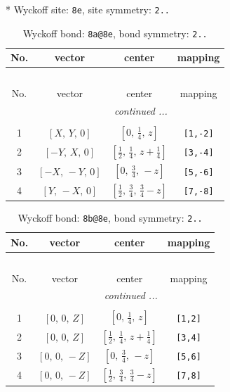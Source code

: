 \documentclass[fleqn,8pt]{jsarticle}
\begin{document}
* Wyckoff site: {\tt 8e}, site symmetry: {\tt 2..}
\renewcommand{\arraystretch}{1.2}
\begin{longtable}{cccc}
\caption{Wyckoff bond: {\tt 8a@8e}, bond symmetry: {\tt 2..}}
 \\
 \hline \hline
No. & vector & center & mapping \\ \hline \endfirsthead

\multicolumn{3}{l}{\tablename\ \thetable{}} \\
 \hline \hline
No. & vector & center & mapping \\ \hline \endhead

 \hline \hline
\multicolumn{3}{r}{\footnotesize\it continued ...} \\ \endfoot

 \hline \hline
\multicolumn{3}{r}{} \\ \endlastfoot

1 & $\left[ X,\, Y,\, 0 \right]$ & $\left[ 0,\, \frac{1}{4},\, z \right]$ & {\tt [1,-2]} \\ \hline
2 & $\left[ - Y,\, X,\, 0 \right]$ & $\left[ \frac{1}{2},\, \frac{1}{4},\, z + \frac{1}{4} \right]$ & {\tt [3,-4]} \\ \hline
3 & $\left[ - X,\, - Y,\, 0 \right]$ & $\left[ 0,\, \frac{3}{4},\, - z \right]$ & {\tt [5,-6]} \\ \hline
4 & $\left[ Y,\, - X,\, 0 \right]$ & $\left[ \frac{1}{2},\, \frac{3}{4},\, \frac{3}{4} - z \right]$ & {\tt [7,-8]} \\
\end{longtable}
\renewcommand{\arraystretch}{1.2}
\begin{longtable}{cccc}
\caption{Wyckoff bond: {\tt 8b@8e}, bond symmetry: {\tt 2..}}
 \\
 \hline \hline
No. & vector & center & mapping \\ \hline \endfirsthead

\multicolumn{3}{l}{\tablename\ \thetable{}} \\
 \hline \hline
No. & vector & center & mapping \\ \hline \endhead

 \hline \hline
\multicolumn{3}{r}{\footnotesize\it continued ...} \\ \endfoot

 \hline \hline
\multicolumn{3}{r}{} \\ \endlastfoot

1 & $\left[ 0,\, 0,\, Z \right]$ & $\left[ 0,\, \frac{1}{4},\, z \right]$ & {\tt [1,2]} \\ \hline
2 & $\left[ 0,\, 0,\, Z \right]$ & $\left[ \frac{1}{2},\, \frac{1}{4},\, z + \frac{1}{4} \right]$ & {\tt [3,4]} \\ \hline
3 & $\left[ 0,\, 0,\, - Z \right]$ & $\left[ 0,\, \frac{3}{4},\, - z \right]$ & {\tt [5,6]} \\ \hline
4 & $\left[ 0,\, 0,\, - Z \right]$ & $\left[ \frac{1}{2},\, \frac{3}{4},\, \frac{3}{4} - z \right]$ & {\tt [7,8]} \\
\end{longtable}
\end{document}
